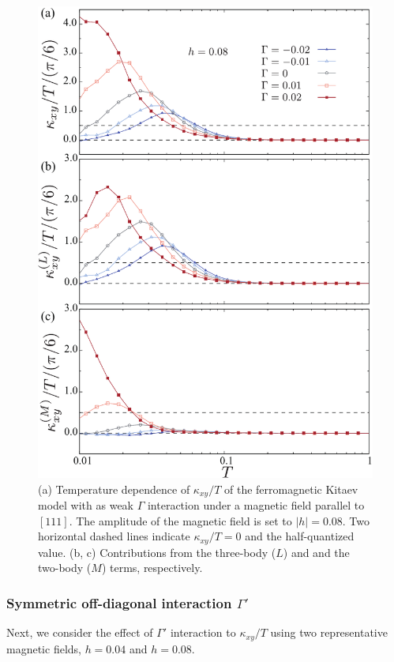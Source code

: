 \documentclass[reprint,amsmath,amssymb,aps,prx]{revtex4-2}
\begin{document}
\begin{figure}
  \begin{center}
    \includegraphics[width=0.9\linewidth]{Figs/plot_k_all_h0.08_G.pdf}
  \end{center}
  \caption{(a) Temperature dependence of $\kappa_{xy}/T$ of the ferromagnetic Kitaev model with as weak $\Gamma$ interaction under a magnetic field parallel to $[111]$. The amplitude of the magnetic field is set to $|h|=0.08$. Two horizontal dashed lines indicate $\kappa_{xy}/T = 0$ and the half-quantized value. (b, c) Contributions from the three-body ($L$) and and the two-body ($M$) terms, respectively.}
  \label{fig:k_all_h0.08_G}
\end{figure}
   
   

   \subsubsection{Symmetric off-diagonal interaction $\Gamma'$}
   Next, we consider the effect of $\Gamma'$ interaction to $\kappa_{xy}/T$ using two representative magnetic fields, $h=0.04$ and $h=0.08$. 
   
\end{document}
